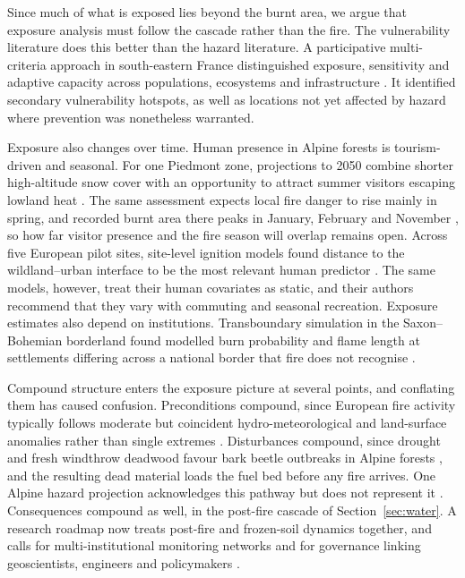 \documentclass[11pt,a4paper]{article}
\begin{document}
Since much of what is exposed lies beyond the burnt area, we argue that exposure analysis must follow the cascade rather than the fire. The vulnerability literature does this better than the hazard literature. A participative multi-criteria approach in south-eastern France distinguished exposure, sensitivity and adaptive capacity across populations, ecosystems and infrastructure \citep{riviere_mapping_2023}. It identified secondary vulnerability hotspots, as well as locations not yet affected by hazard where prevention was nonetheless warranted.

Exposure also changes over time. Human presence in Alpine forests is tourism-driven and seasonal. For one Piedmont zone, projections to 2050 combine shorter high-altitude snow cover with an opportunity to attract summer visitors escaping lowland heat \citep{pede_mountain_2022}. The same assessment expects local fire danger to rise mainly in spring, and recorded burnt area there peaks in January, February and November \citep{pede_mountain_2022}, so how far visitor presence and the fire season will overlap remains open. Across five European pilot sites, site-level ignition models found distance to the wildland--urban interface to be the most relevant human predictor \citep{gelabert_assessing_2025}. The same models, however, treat their human covariates as static, and their authors recommend that they vary with commuting and seasonal recreation. Exposure estimates also depend on institutions. Transboundary simulation in the Saxon--Bohemian borderland found modelled burn probability and flame length at settlements differing across a national border that fire does not recognise \citep{avouris_exposure_2025}.

Compound structure enters the exposure picture at several points, and conflating them has caused confusion. Preconditions compound, since European fire activity typically follows moderate but coincident hydro-meteorological and land-surface anomalies rather than single extremes \citep{miller_compounding_2025}. Disturbances compound, since drought and fresh windthrow deadwood favour bark beetle outbreaks in Alpine forests \citep{bebi_changes_2017}, and the resulting dead material loads the fuel bed before any fire arrives. One Alpine hazard projection acknowledges this pathway but does not represent it \citep{gerberding_mapping_2025}. Consequences compound as well, in the post-fire cascade of Section~\ref{sec:water}. A research roadmap now treats post-fire and frozen-soil dynamics together, and calls for multi-institutional monitoring networks and for governance linking geoscientists, engineers and policymakers \citep{baselt_compound_2026}.
\end{document}

